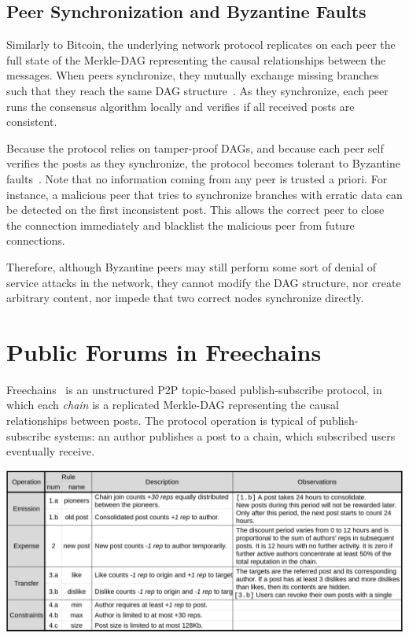 \documentclass[12pt]{article}
\newcommand{\FC}       {Freechains\xspace}
\begin{document}
\subsection{Peer Synchronization and Byzantine Faults}

Similarly to Bitcoin, the underlying network protocol replicates on each peer
the full state of the Merkle-DAG representing the causal relationships between
the messages.
When peers synchronize, they mutually exchange missing branches such that they
reach the same DAG structure~\cite{p2p.byz}.
As they synchronize, each peer runs the consensus algorithm locally and
verifies if all received posts are consistent.

Because the protocol relies on tamper-proof DAGs, and because each peer self
verifies the posts as they synchronize, the protocol becomes tolerant to
Byzantine faults~\cite{lamport.byz}.
%
Note that no information coming from any peer is trusted a priori.
%
For instance, a malicious peer that tries to synchronize branches with erratic
data can be detected on the first inconsistent post.
This allows the correct peer to close the connection immediately and blacklist
the malicious peer from future connections.

Therefore, although Byzantine peers may still perform some sort of denial of
service attacks in the network, they cannot modify the DAG structure, nor
create arbitrary content, nor impede that two correct nodes synchronize
directly.

\section{Public Forums in Freechains}
\label{sec.freechains}

\FC~\cite{fcs.sbseg20} is an unstructured P2P topic-based publish-subscribe
protocol, in which each \emph{chain} is a replicated Merkle-DAG representing
the causal relationships between posts.
%
The protocol operation is typical of publish-subscribe systems: an author
publishes a post to a chain, which subscribed users eventually receive.

\begin{table}
\centering
\includegraphics[width=\textwidth]{rules.png}
\caption{
    Reputation rules for public forum chains in \FC.
    The chosen constants ($30~reps$, $24h$, etc) are arbitrary and target
    typical Internet forums.
}
\label{fig.rules}
\end{table}
\end{document}
